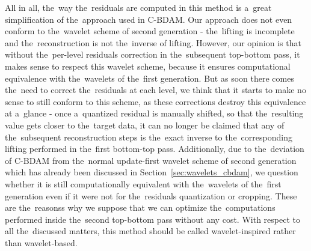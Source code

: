 All in all, the~way the~residuals are computed in this method is a~great simplification of the~approach used in C-BDAM. Our approach does not even conform to the~wavelet scheme of second generation - the~lifting is incomplete and the~reconstruction is not the~inverse of lifting. However, our opinion is that without the~per-level residuals correction in the~subsequent top-bottom pass, it makes sense to respect this wavelet scheme, because it ensures computational equivalence with the~wavelets of the~first generation. But as soon there comes the~need to correct the~residuals at each level, we think that it starts to make no sense to still conform to this scheme, as these corrections destroy this equivalence at a~glance - once a~quantized residual is manually shifted, so that the~resulting value gets closer to the~target data, it can no longer be claimed that any of the~subsequent reconstruction steps is the~exact inverse to the~corresponding lifting performed in the~first bottom-top pass. Additionally, due to the~deviation of C-BDAM from the~normal update-first wavelet scheme of second generation which has already been discussed in Section~\ref{sec:wavelets_cbdam}, we question whether it is still computationally equivalent with the~wavelets of the~first generation even if it were not for the~residuals quantization or cropping. These are the~reasonss why we suppose that we can optimize the~computations performed inside the~second top-bottom pass without any cost. With respect to all the~discussed matters, this method should be called wavelet-inspired rather than wavelet-based.